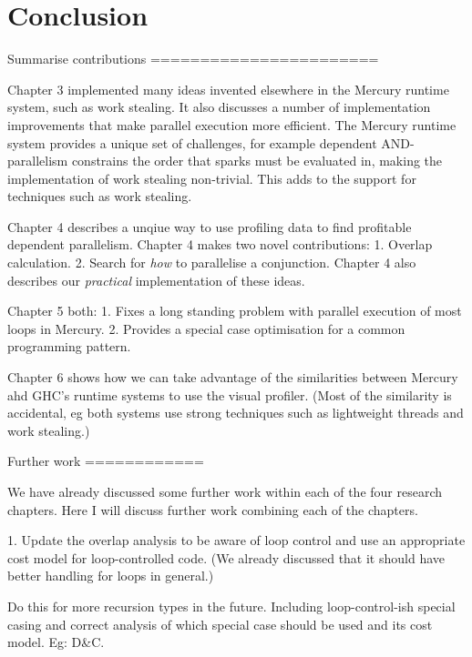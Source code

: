 
\chapter{Conclusion}
\label{chap:conc}


Summarise contributions
=======================

    Chapter 3 implemented many ideas invented elsewhere in the Mercury
    runtime system, such as work stealing.
    It also discusses a number of implementation improvements that make
    parallel execution more efficient.
    The Mercury runtime system provides a unique set of challenges, for
    example dependent AND-parallelism constrains the order that sparks must
    be evaluated in, making the implementation of work stealing non-trivial.
    This adds to the support for techniques such as work stealing.

    Chapter 4 describes a unqiue way to use profiling data to find
    profitable dependent parallelism.
    Chapter 4 makes two novel contributions:
        1. Overlap calculation.
        2. Search for \emph{how} to parallelise a conjunction.
    Chapter 4 also describes our \emph{practical} implementation
    of these ideas.

    Chapter 5 both:
        1. Fixes a long standing problem with parallel execution of most
        loops in Mercury.
        2. Provides a special case optimisation for a common programming
        pattern.

    Chapter 6 shows how we can take advantage of the similarities between
    Mercury ahd GHC's runtime systems to use the \tscope visual profiler.
    (Most of the similarity is accidental, eg both systems use strong
    techniques such as lightweight threads and work stealing.)

Further work
============

We have already discussed some further work within each of the four
research chapters.
Here I will discuss further work combining each of the chapters.

    1. Update the overlap analysis to be aware of loop control and use an
       appropriate cost model for loop-controlled code.
       (We already discussed that it should have better handling for loops
       in general.)

       Do this for more recursion types in the future.  Including
       loop-control-ish special casing and correct analysis of which special
       case should be used and its cost model.  Eg: D\&C.

